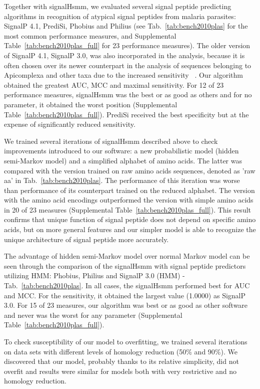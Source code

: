 \documentclass[10pt,letterpaper]{article}
\begin{document}
Together with signalHsmm, we evaluated several signal peptide predicting algorithms in recognition of atypical signal peptides from malaria parasites: SignalP 4.1, PrediSi, Phobius and Philius (see Tab.~\ref{tab:bench2010plas} for the most common performance measures, and Supplemental Table~\ref{tab:bench2010plas_full} for 23 performance measures). The older version of SignalP 4.1, SignalP 3.0, was also incorporated in the analysis, because it is often chosen over its newer counterpart in the analysis of sequences belonging to Apicomplexa and other taxa due to the increased sensitivity ~\cite{2012cilingirapicoap, sperschneider_evaluation_2015}. 
Our algorithm obtained the greatest AUC, MCC and maximal sensitivity. For 12 of 23 performance measures, signalHsmm was the best or as good as others and for no parameter, it obtained the worst position (Supplemental Table~\ref{tab:bench2010plas_full}). PrediSi received the best specificity but at the expense of significantly reduced sensitivity.

We trained several iterations of signalHsmm  described above to check improvements introduced to our software: a new probabilistic model (hidden semi-Markov model) and a simplified alphabet of amino acids. The latter was compared with the version trained on raw amino acids sequences, denoted as 'raw aa' in Tab.~\ref{tab:bench2010plas}. The performance of this iteration was  worse than performance of its counterpart trained on the reduced alphabet. The version with the amino acid encodings outperformed the version with simple amino acids in 20 of 23 measures (Supplemental Table~\ref{tab:bench2010plas_full}). This result confirms that unique function of signal peptide does not depend on specific amino acids, but on more general features and our simpler model is able to recognize the unique architecture of signal peptide more accurately.

The advantage of hidden semi-Markov model over normal Markov model can be seen through the comparison of the signalHsmm with signal peptide predictors utilizing HMM: Phobius, Philius and SignalP 3.0 (HMM) - Tab.~\ref{tab:bench2010plas}. In all cases, the signalHsmm performed best for AUC and MCC. For the sensitivity, it obtained the largest value (1.0000) as SignalP 3.0. For 15 of 23 measures, our algorithm was best or as good as other software and never was the worst for any parameter (Supplemental Table~\ref{tab:bench2010plas_full}).

To check susceptibility of our model to overfitting, we trained several iterations on data sets with different levels of homology reduction (50\% and 90\%). We discovered that our model, probably thanks to its relative simplicity, did not overfit and results were similar for models both with very restrictive and no homology reduction.
\end{document}
